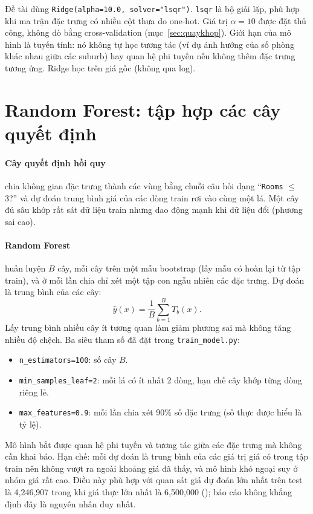 Đề tài dùng \texttt{Ridge(alpha=10.0, solver="lsqr")}. \texttt{lsqr} là bộ giải lặp, phù hợp khi ma trận đặc trưng có nhiều cột thưa do one-hot. Giá trị $\alpha = 10$ được đặt thủ công, không dò bằng cross-validation (mục~\ref{sec:quaykhop}). Giới hạn của mô hình là tuyến tính: nó không tự học tương tác (ví dụ ảnh hưởng của số phòng khác nhau giữa các suburb) hay quan hệ phi tuyến nếu không thêm đặc trưng tương ứng. Ridge học trên giá gốc (không qua log).

\section{Random Forest: tập hợp các cây quyết định}\label{sec:rf}
\paragraph{Cây quyết định hồi quy} chia không gian đặc trưng thành các vùng bằng chuỗi câu hỏi dạng ``\texttt{Rooms} $\le$ 3?'' và dự đoán trung bình giá của các dòng train rơi vào cùng một lá. Một cây đủ sâu khớp rất sát dữ liệu train nhưng dao động mạnh khi dữ liệu đổi (phương sai cao).

\paragraph{Random Forest} \cite{breiman2001} huấn luyện $B$ cây, mỗi cây trên một mẫu bootstrap (lấy mẫu có hoàn lại từ tập train), và ở mỗi lần chia chỉ xét một tập con ngẫu nhiên các đặc trưng. Dự đoán là trung bình của các cây:
\[ \hat{y}(x) = \frac{1}{B}\sum_{b=1}^{B} T_b(x). \]
Lấy trung bình nhiều cây ít tương quan làm giảm phương sai mà không tăng nhiều độ chệch. Ba siêu tham số đã đặt trong \texttt{train\_model.py}:
\begin{itemize}[nosep]
  \item \texttt{n\_estimators=100}: số cây $B$.
  \item \texttt{min\_samples\_leaf=2}: mỗi lá có ít nhất 2 dòng, hạn chế cây khớp từng dòng riêng lẻ.
  \item \texttt{max\_features=0.9}: mỗi lần chia xét 90\% số đặc trưng (số thực được hiểu là tỷ lệ).
\end{itemize}
Mô hình bắt được quan hệ phi tuyến và tương tác giữa các đặc trưng mà không cần khai báo. Hạn chế: mỗi dự đoán là trung bình của các giá trị giá có trong tập train nên không vượt ra ngoài khoảng giá đã thấy, và mô hình khó ngoại suy ở nhóm giá rất cao. Điều này phù hợp với quan sát giá dự đoán lớn nhất trên test là 4,246,907 trong khi giá thực lớn nhất là 6,500,000 (); báo cáo không khẳng định đây là nguyên nhân duy nhất.


